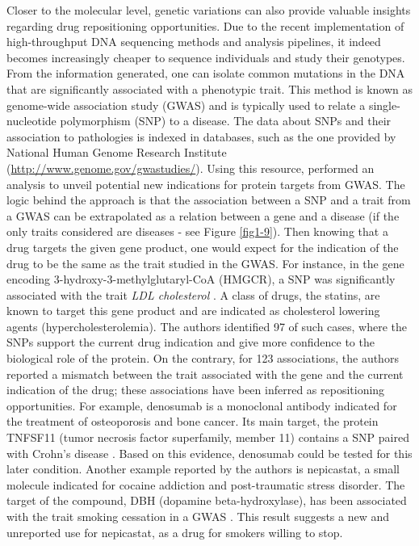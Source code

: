 Closer to the molecular level, genetic variations can also provide valuable insights regarding drug repositioning opportunities. Due to the recent implementation of high-throughput DNA sequencing methods and analysis pipelines, it indeed becomes increasingly cheaper to sequence individuals and study their genotypes. From the information generated, one can isolate common mutations in the DNA that are significantly associated with a phenotypic trait. This method is known as genome-wide association study (GWAS) and is typically used to relate a single-nucleotide polymorphism (SNP) to a disease. The data about SNPs and their association to pathologies is indexed in databases, such as the one provided by National Human Genome Research Institute (\url{http://www.genome.gov/gwastudies/}). Using this resource, \cite{sanseau2012use} performed an analysis to unveil potential new indications for protein targets from GWAS. The logic behind the approach is that the association between a SNP and a trait from a GWAS can be extrapolated as a relation between a gene and a disease (if the only traits considered are diseases - see Figure \ref{fig1-9}). Then knowing that a drug targets the given gene product, one would expect for the indication of the drug to be the same as the trait studied in the GWAS. For instance, in the gene encoding 3-hydroxy-3-methylglutaryl-CoA (HMGCR), a SNP was significantly associated with the trait \emph{LDL cholesterol} \citep{kathiresan2008six}. A class of drugs, the statins, are known to target this gene product and are indicated as cholesterol lowering agents (hypercholesterolemia). The authors identified 97 of such cases, where the SNPs support the current drug indication and give more confidence to the biological role of the protein. On the contrary, for 123 associations, the authors reported a mismatch between the trait associated with the gene and the current indication of the drug; these associations have been inferred as repositioning opportunities. For example, denosumab is a monoclonal antibody indicated for the treatment of osteoporosis and bone cancer. Its main target, the protein TNFSF11 (tumor necrosis factor superfamily, member 11) contains a SNP paired with Crohn's disease \citep{franke2010genome}. Based on this evidence, denosumab could be tested for this later condition. Another example reported by the authors is nepicastat, a small molecule indicated for cocaine addiction and post-traumatic stress disorder. The target of the compound, DBH (dopamine beta-hydroxylase), has been associated with the trait smoking cessation in a GWAS \citep{furberg2010genome}. This result suggests a new and unreported use for nepicastat, as a drug for smokers willing to stop.

